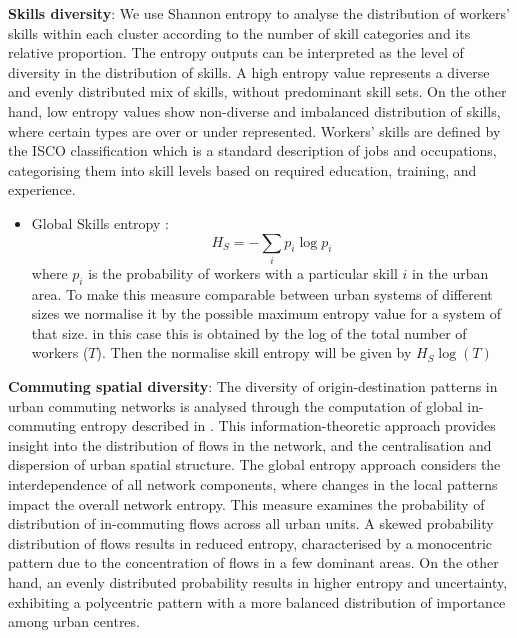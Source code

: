 \documentclass[11pt, a4paper]{article}
\begin{document}
\textbf{Skills diversity}: We use Shannon entropy to analyse the distribution of workers' skills within each cluster according to the number of skill categories and its relative proportion. The entropy outputs can be interpreted as the level of diversity in the distribution of skills. A high entropy value represents a diverse and evenly distributed mix of skills, without predominant skill sets. On the other hand, low entropy values show non-diverse and imbalanced distribution of skills, where certain types are over or under represented. Workers' skills are defined by the ISCO classification which is a standard description of jobs and occupations, categorising them into skill levels based on required education, training, and experience. 

\begin{itemize}
\item Global Skills entropy \citep{Shannon1948}:
\begin{equation}
  H_{S}= -\sum_{i}  p_{i}  \log p_{i}
\end{equation} 
where $ p_{i}$ is the probability of workers with a particular skill $i$ in the urban area. To make this measure comparable between urban systems of different sizes we normalise it by the possible maximum entropy value for a system of that size. in this case this is obtained by the log of the total number of workers ($T$). Then the normalise skill entropy will be given by $H_{S}\log(T)$
\end{itemize}

\textbf{Commuting spatial diversity}: The diversity of origin-destination patterns in urban commuting networks is analysed through the computation of global in-commuting entropy described in \citep{Marin2022}. This information-theoretic approach provides insight into the distribution of flows in the network, and the centralisation and dispersion of urban spatial structure. The global entropy approach considers the interdependence of all network components, where changes in the local patterns impact the overall network entropy. This measure examines the probability of distribution of in-commuting flows across all urban units. A skewed probability distribution of flows results in reduced entropy, characterised by a monocentric pattern due to the concentration of flows in a few dominant areas. On the other hand, an evenly distributed probability results in higher entropy and uncertainty, exhibiting a polycentric pattern with a more balanced distribution of importance among urban centres.
\end{document}
